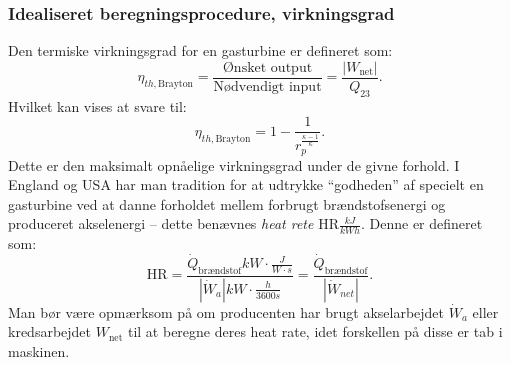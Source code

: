 \subsubsection{Idealiseret beregningsprocedure, virkningsgrad}
Den termiske virkningsgrad for en gasturbine er defineret som:
\[ 
\eta_{th, \mathrm{Brayton}} = \frac{\text{Ønsket output}}{\text{Nødvendigt input}} = \frac{\left| W_{\mathrm{net}} \right|}{Q_{23}}
.\]
Hvilket kan vises at svare til:
\[ 
\eta_{th, \mathrm{Brayton}} = 1 - \frac{1}{r_p^{\frac{\kappa - 1}{\kappa}}}
.\]
Dette er den maksimalt opnåelige virkningsgrad under de givne forhold. I England og USA har man tradition for at udtrykke ``godheden'' af specielt en gasturbine ved at danne forholdet mellem forbrugt brændstofsenergi og produceret akselenergi -- dette benævnes \textit{heat rete} $\mathrm{HR} \unit{\frac{kJ}{kWh}}$. Denne er defineret som:
\[ 
\mathrm{HR} = \frac{\dot{Q}_{\text{brændstof}} \unit{kW} \cdot \unit{\frac{J}{W\cdot s}}}{\left| \dot{W}_a \right| \unit{kW} \cdot \unit{\frac{h}{3600s}}} = \frac{\dot{Q}_{\text{brændstof}}}{\left| \dot{W}_{net} \right|}
.\]
Man bør være opmærksom på om producenten har brugt akselarbejdet $\dot{W}_a$ eller kredsarbejdet $W_{\mathrm{net}}$ til at beregne deres heat rate, idet forskellen på disse er tab i maskinen. 
